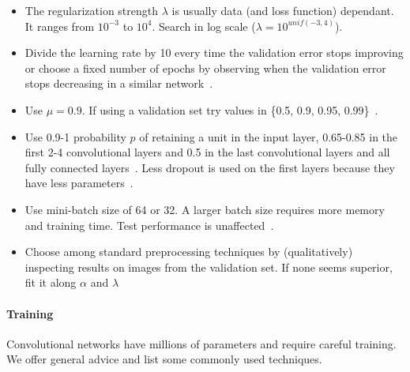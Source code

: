 \begin{itemize}
	\item The regularization strength $\lambda$ is usually data (and loss function) dependant. It ranges from $10^{-3}$ to $10^4$. Search in log scale ($\lambda = 10^{unif(-3, 4)}$).
	\item Divide the learning rate by 10 every time the validation error stops improving or choose a fixed number of epochs by observing when the validation error stops decreasing in a similar network~\cite{Krizhevsky2012, He2015b}.

	\item Use $\mu=0.9$. If using a validation set try values in \{0.5, 0.9, 0.95, 0.99\}~\cite{Karpathy2016}.

	\item Use 0.9-1 probability $p$ of retaining a unit in the input layer, 0.65-0.85 in the first 2-4 convolutional layers and 0.5 in the last convolutional layers and all fully connected layers~\cite{Srivastava2014}. Less dropout is used on the first layers because they have less parameters~\cite{Karpathy2016}.

	\item Use mini-batch size of 64 or 32. A larger batch size requires more memory and training time. Test performance is unaffected~\cite{Bengio2012}.

	\item Choose among standard preprocessing techniques by (qualitatively) inspecting results on images from the validation set. If none seems superior, fit it along $\alpha$ and $\lambda$%
\end{itemize}



\paragraph{Training} Convolutional networks have millions of parameters and require careful training. We offer general advice and list some commonly used techniques.


